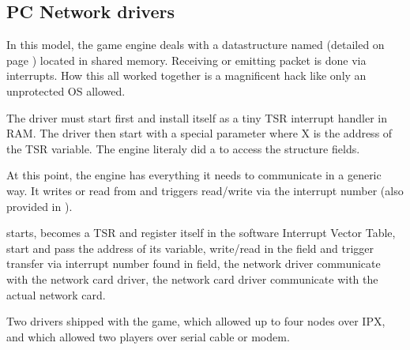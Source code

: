 




\subsection{PC Network drivers}
In this model, the game engine deals with a datastructure named  (detailed on page \pageref{doomcom_t.c}) located in shared memory. Receiving or emitting packet is done via interrupts. How this all worked together is a magnificent hack like only an unprotected OS allowed.\\
\par
The driver must start first and install itself as a tiny TSR interrupt handler in RAM. The driver then start  with a special parameter  where X is the address of the TSR  variable. The engine literaly did a  to access the structure fields.\\
\par

\par
 At this point, the engine has everything it needs to communicate in a generic way. It writes or read from  and triggers read/write via the interrupt number (also provided in ).\\
\par
{}
\par
{}  starts, becomes a TSR and register itself in the software Interrupt Vector Table,   start  and pass the address of its  variable,   write/read in the   field and trigger transfer via interrupt number found in  field,  the \doom{} network driver communicate with the network card driver,  the network card driver communicate with the actual network card.\\
\par
Two drivers shipped with the game,  which allowed up to four nodes over IPX, and  which allowed two players over serial cable or modem.






